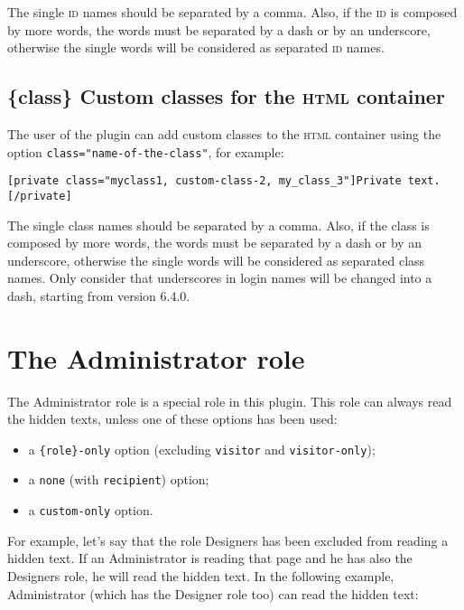 The single \textsc{id} names should be separated by a comma. Also, if the
\textsc{id} is composed by more words, the words must be separated by a dash or
by an underscore, otherwise the single words will be considered as separated
\textsc{id} names.

\section{\{class\} Custom classes for the \textsc{html} container}

The user of the plugin can add custom classes to the \textsc{html} container
using the option \verb+class="name-of-the-class"+, for example:

\begin{lstlisting}
[private class="myclass1, custom-class-2, my_class_3"]Private text.[/private]
\end{lstlisting}

The single class names should be separated by a comma. Also, if the class is
composed by more words, the words must be separated by a dash or by an
underscore, otherwise the single words will be considered as separated class
names. Only consider that underscores in login names will be changed into a
dash, starting from version 6.4.0.

\chapter{The Administrator role}

\label{sec:admin-role}

The Administrator role is a special role in this plugin. This role can always
read the hidden texts, unless one of these options has been used:

\begin{itemize}
 \item a \verb+{role}-only+ option (excluding \verb+visitor+ and
 \verb+visitor-only+);
 \item a \verb+none+ (with \verb+recipient+) option;
 \item a \verb+custom-only+ option.
\end{itemize}

For example, let's say that the role Designers has been excluded from reading a
hidden text. If an Administrator is reading that page and he has also the
Designers role, he will read the hidden text. In the following example,
Administrator (which has the Designer role too) can read the hidden text:

